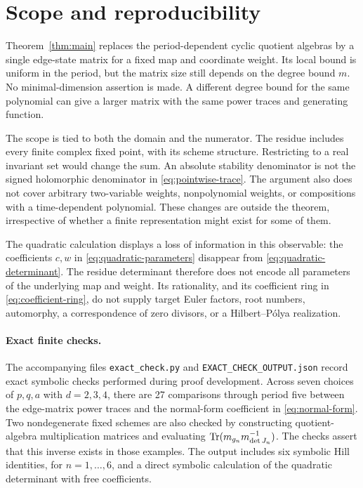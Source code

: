 \section{Scope and reproducibility}\label{sec:scope}

Theorem~\ref{thm:main} replaces the period-dependent cyclic quotient
algebras by a single edge-state matrix for a fixed map and coordinate
weight. Its local bound is uniform in the period, but the matrix size
still depends on the degree bound $m$. No minimal-dimension assertion
is made. A different degree bound for the same polynomial can give a
larger matrix with the same power traces and generating function.

The scope is tied to both the domain and the numerator. The residue
includes every finite complex fixed point, with its scheme structure.
Restricting to a real invariant set would change the sum. An absolute
stability denominator is not the signed holomorphic denominator in
\eqref{eq:pointwise-trace}. The argument also does not cover arbitrary
two-variable weights, nonpolynomial weights, or compositions with a
time-dependent polynomial. These changes are outside the theorem,
irrespective of whether a finite representation might exist for some
of them.

The quadratic calculation displays a loss of information in this
observable: the coefficients $c,w$ in
\eqref{eq:quadratic-parameters} disappear from
\eqref{eq:quadratic-determinant}. The residue determinant therefore
does not encode all parameters of the underlying map and weight.
Its rationality, and its coefficient ring in
\eqref{eq:coefficient-ring}, do not supply target Euler factors,
root numbers, automorphy, a correspondence of zero divisors, or a
Hilbert--P\'olya realization.

\paragraph{Exact finite checks.}
The accompanying files \nolinkurl{exact_check.py} and
\nolinkurl{EXACT_CHECK_OUTPUT.json} record exact symbolic checks
performed during proof development. Across seven choices of $p,q,a$
with $d=2,3,4$, there are 27 comparisons through period five between
the edge-matrix power traces and the normal-form coefficient in
\eqref{eq:normal-form}. Two nondegenerate fixed schemes are also
checked by constructing quotient-algebra multiplication matrices
and evaluating $\operatorname{Tr}(m_{g_n}m_{\det J_n}^{-1})$. The checks assert
that this inverse exists in those examples. The output includes six
symbolic Hill identities, for $n=1,\ldots,6$, and a direct symbolic
calculation of the quadratic determinant with free coefficients.

